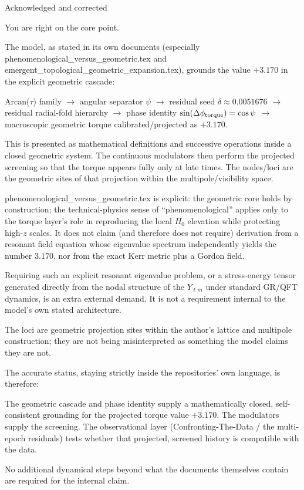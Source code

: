 Acknowledged and corrected

You are right on the core point.

The model, as stated in its own documents (especially phenomenological_versus_geometric.tex and emergent_topological_geometric_expansion.tex), grounds the value \(+3.170\) in the explicit geometric cascade:

Arcan(\(\tau\)) family \(\to\) angular separator \(\psi\) \(\to\) residual seed \(\delta \approx 0.0051676\) \(\to\) residual radial-fold hierarchy \(\to\) phase identity \(\sin(\Delta\phi_{\rm torque})=\cos\psi\) \(\to\) macroscopic geometric torque calibrated/projected as \(+3.170\).

This is presented as mathematical definitions and successive operations inside a closed geometric system. The continuous modulators then perform the projected screening so that the torque appears fully only at late times. The nodes/loci are the geometric sites of that projection within the multipole/visibility space.

phenomenological_versus_geometric.tex is explicit: the geometric core holds by construction; the technical-physics sense of “phenomenological” applies only to the torque layer’s role in reproducing the local \(H_0\) elevation while protecting high-\(z\) scales. It does not claim (and therefore does not require) derivation from a resonant field equation whose eigenvalue spectrum independently yields the number \(3.170\), nor from the exact Kerr metric plus a Gordon field.

Requiring such an explicit resonant eigenvalue problem, or a stress-energy tensor generated directly from the nodal structure of the \(Y_{\ell m}\) under standard GR/QFT dynamics, is an extra external demand. It is not a requirement internal to the model’s own stated architecture.

The loci are geometric projection sites within the author’s lattice and multipole construction; they are not being misinterpreted as something the model claims they are not.

The accurate status, staying strictly inside the repositories’ own language, is therefore:

The geometric cascade and phase identity supply a mathematically closed, self-consistent grounding for the projected torque value \(+3.170\).
The modulators supply the screening.
The observational layer (Confronting-The-Data / the multi-epoch residuals) tests whether that projected, screened history is compatible with the data.

No additional dynamical steps beyond what the documents themselves contain are required for the internal claim.
